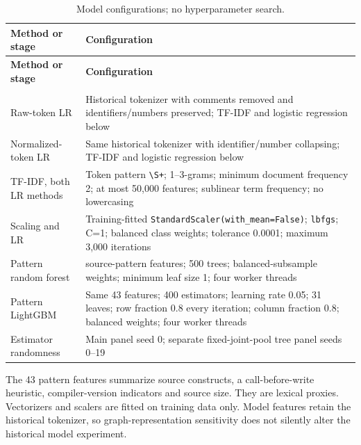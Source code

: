 \documentclass[preprint,12pt]{elsarticle}
\begin{document}
\begingroup
\small
\setlength{\tabcolsep}{4pt}
\setlength{\LTcapwidth}{\linewidth}
\renewcommand{\arraystretch}{1.14}
\begin{longtable}{>{\raggedright\arraybackslash}p{}>{\raggedright\arraybackslash}p{}}
\caption{Model configurations; no hyperparameter search.}\label{tab:2}\\
\toprule
\textbf{Method or stage} & \textbf{Configuration} \\
\midrule
\endfirsthead
\toprule
\textbf{Method or stage} & \textbf{Configuration} \\
\midrule
\endhead
\midrule
\multicolumn{2}{r}{\footnotesize Continued on next page} \\
\endfoot
\bottomrule
\endlastfoot
Raw-token LR & Historical tokenizer with comments removed and identifiers/numbers preserved; TF-IDF and logistic regression below \\
Normalized-token LR & Same historical tokenizer with identifier/number collapsing; TF-IDF and logistic regression below \\
TF-IDF, both LR methods & Token pattern \texttt{\textbackslash{}S+}; 1--3-grams; minimum document frequency 2; at most 50,000 features; sublinear term frequency; no lowercasing \\
Scaling and LR & Training-fitted \texttt{StandardScaler(with\_mean=False)}; \texttt{lbfgs}; C=1; balanced class weights; tolerance 0.0001; maximum 3,000 iterations \\
Pattern random forest & 43 source-pattern features; 500 trees; balanced-subsample weights; minimum leaf size 1; four worker threads \\
Pattern LightGBM & Same 43 features; 400 estimators; learning rate 0.05; 31 leaves; row fraction 0.8 every iteration; column fraction 0.8; balanced weights; four worker threads \\
Estimator randomness & Main panel seed 0; separate fixed-joint-pool tree panel seeds 0--19 \\
\end{longtable}
\endgroup

The 43 pattern features summarize source constructs, a call-before-write heuristic, compiler-version indicators and source size. They are lexical proxies. Vectorizers and scalers are fitted on training data only. Model features retain the historical tokenizer, so graph-representation sensitivity does not silently alter the historical model experiment.
\end{document}
